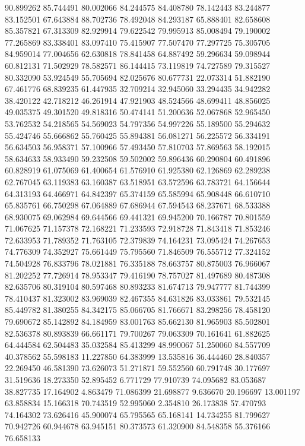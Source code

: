 90.899262
85.744491
80.002066
84.244575
84.408780
78.142443
83.244877
83.152501
67.643884
88.702736
78.492048
84.293187
65.888401
82.658608
85.357821
67.313309
82.929914
79.622542
79.995913
85.008494
79.190002
77.265869
83.338401
83.097410
75.415907
77.507470
77.297725
75.305705
84.959014
77.004656
62.630818
78.841458
64.887492
59.296634
59.098944
60.812131
71.502929
78.582571
86.144415
73.119819
74.727589
79.315527
80.332090
53.924549
55.705694
82.025676
80.677731
22.073314
51.882190
67.461776
68.839235
61.447935
32.709214
32.945060
33.294435
34.942282
38.420122
42.718212
46.261914
47.921903
48.524566
48.699411
48.856025
49.035375
49.301520
49.818316
50.474141
51.200636
52.067868
52.965450
53.762532
54.218565
54.569023
54.797356
54.997226
55.189500
55.294632
55.424746
55.666862
55.760425
55.894381
56.081271
56.225572
56.334191
56.634503
56.958371
57.100966
57.493450
57.810703
57.869563
58.192015
58.634633
58.933490
59.232508
59.502002
59.896436
60.290804
60.491896
60.828919
61.075069
61.400654
61.576910
61.925380
62.126869
62.289238
62.767045
63.119383
63.160387
63.518951
63.572596
63.783721
64.156644
64.313193
64.466971
64.842397
65.374159
65.585994
65.908448
66.610710
65.835761
66.750298
67.064889
67.686944
67.594543
68.237671
68.533388
68.930075
69.062984
69.644566
69.441321
69.945200
70.166787
70.801559
71.067625
71.157378
72.168221
71.233593
72.918728
71.843418
71.853246
72.633953
71.789352
71.763105
72.379839
74.164231
73.095424
74.267653
74.776309
74.352927
75.661449
75.795560
71.846509
76.555712
77.324152
74.504928
76.833796
78.021881
76.335188
78.663757
80.875003
76.966067
81.202252
77.726914
78.953347
79.416190
78.757027
81.497689
80.487308
82.635706
80.319104
80.597468
80.893233
81.674713
79.947777
81.744399
78.410437
81.323002
83.969039
82.467355
84.631826
83.033861
79.532145
85.449782
81.380255
84.342175
85.066705
81.766671
83.298256
78.458120
79.690672
85.142892
84.184959
83.001763
85.662130
81.965903
85.502801
82.536378
80.893839
66.661171
79.700267
79.063309
70.161641
61.882625
64.444584
62.504483
35.032584
85.413299
48.990067
51.250060
84.557709
40.378562
55.598183
11.227850
64.383999
13.535816
36.444460
28.840357
22.269450
46.581390
73.626073
51.271871
59.552560
60.791748
30.177697
31.519636
18.273350
52.895452
6.771729
77.910739
74.095682
83.053687
38.827735
17.164902
4.863479
71.086399
21.698877
9.636670
20.196697
13.001197
63.858834
15.166318
70.743519
52.995060
2.354810
26.173838
57.470793
74.164302
73.626416
45.900074
65.795565
65.168141
14.734255
81.799627
70.942726
60.944678
63.945151
80.373573
61.320900
84.548358
55.376166
76.658133
